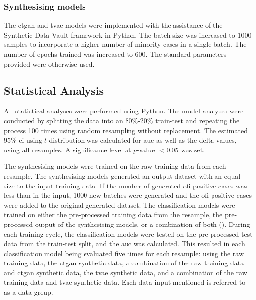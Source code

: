 \documentclass[12pt, a4paper]{article}
\begin{document}
\subsubsection*{Synthesising models}
The \acrfull{ctgan} \cite{xu_modeling_2019} and \acrfull{tvae} \cite{ishfaq_tvae_2018} models were implemented with the assistance of the Synthetic Data Vault framework \cite{patki_sdv_2016} in Python. The batch size was increased to 1000 samples to incorporate a higher number of minority cases in a single batch. The number of epochs trained was increased to 600. The standard parameters provided were otherwise used.

\subsection{Statistical Analysis}
All statistical analyses were performed using Python. The model analyses were conducted by splitting the data into an 80\%-20\% train-test and repeating the process 100 times using random resampling without replacement. The estimated 95\% \acrfull{ci} using $t$-distribution was calculated for \acrfull{auc} as well as the delta values, using all resamples. A significance level at $p$-value $< 0.05$ was set.

The synthesising models were trained on the raw training data from each resample. The synthesising models generated an output dataset with an equal size to the input training data. If the number of generated \acrshort{ofi} positive cases was less than in the input, 1000 new batches were generated and the \acrshort{ofi} positive cases were added to the original generated dataset. The classification models were trained on either the pre-processed training data from the resample, the pre-processed output of the synthesising models, or a combination of both (). During each training cycle, the classification models were tested on the pre-processed test data from the train-test split, and the \acrshort{auc} was calculated. This resulted in each classification model being evaluated five times for each resample: using the raw training data, the \acrshort{ctgan} synthetic data, a combination of the raw training data and \acrshort{ctgan} synthetic data, the \acrshort{tvae} synthetic data, and a combination of the raw training data and \acrshort{tvae} synthetic data. Each data input mentioned is referred to as a data group.
\end{document}
